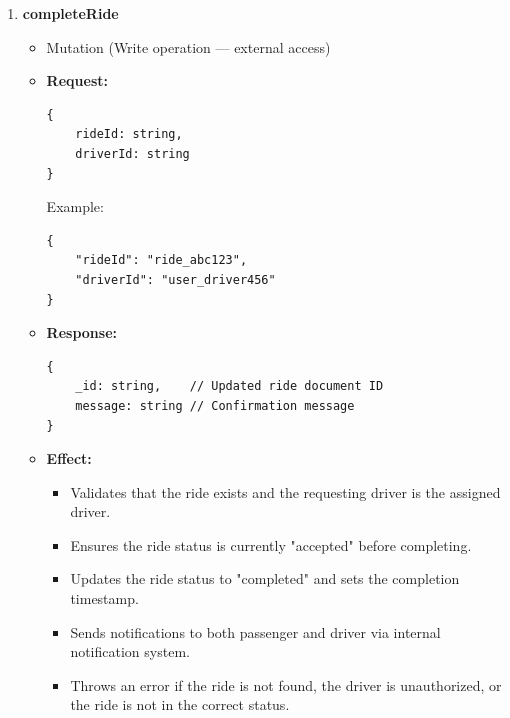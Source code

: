 \documentclass[a4paper,12pt]{article}
\begin{document}
\begin{enumerate}
    \item \textbf{completeRide}
    \begin{itemize}
        \item Mutation (Write operation — external access)
        \item \textbf{Request:}
        \begin{verbatim}
{
    rideId: string,
    driverId: string
}
        \end{verbatim}
        Example:
        \begin{verbatim}
{
    "rideId": "ride_abc123",
    "driverId": "user_driver456"
}
        \end{verbatim}
        \item \textbf{Response:}
        \begin{verbatim}
{
    _id: string,    // Updated ride document ID
    message: string // Confirmation message
}
        \end{verbatim}
        \item \textbf{Effect:}
        \begin{itemize}
            \item Validates that the ride exists and the requesting driver is the assigned driver.
            \item Ensures the ride status is currently "accepted" before completing.
            \item Updates the ride status to "completed" and sets the completion timestamp.
            \item Sends notifications to both passenger and driver via internal notification system.
            \item Throws an error if the ride is not found, the driver is unauthorized, or the ride is not in the correct status.
        \end{itemize}
    \end{itemize}


\end{enumerate}
\end{document}
